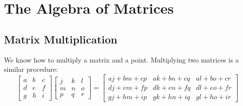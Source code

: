 \begin{problems}
\begin{enumerate}
\end{enumerate}
\end{problems}


\newpage








\section{The Algebra of Matrices}


\subsection{Matrix Multiplication}

We know how to multiply a matrix and a point. Multiplying two
matrices is a similar procedure:
\[
\begin{bmatrix}
a & b & c \\ 
d & e & f \\
g & h & i
\end{bmatrix}
\begin{bmatrix}
j & k & l \\ 
m & n & o \\
p & q & r
\end{bmatrix}
= \begin{bmatrix}
aj + bm + cp & ak + bn + cq & al + bo + cr \\
dj + em + fp & dk + en + fq & dl + eo + fr \\
gj + hm + ip & gk + hn + iq & gl + ho + ir 
\end{bmatrix}
\]

